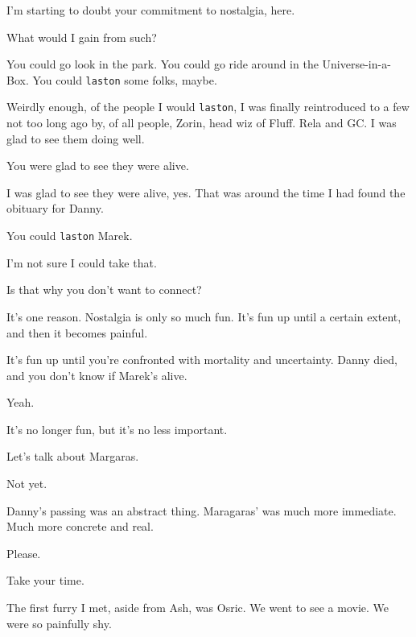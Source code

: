 \begin{paracol}{2}
\begin{leftcolumn}
\begin{ally}
I'm starting to doubt your commitment to nostalgia, here.
\end{ally}
What would I gain from such?

\begin{ally}
You could go look in the park. You could go ride around in the Universe-in-a-Box. You could \texttt{laston} some folks, maybe.
\end{ally}
Weirdly enough, of the people I would \texttt{laston}, I was finally reintroduced to a few not too long ago by, of all people, Zorin, head wiz of Fluff. Rela and GC. I was glad to see them doing well.

\begin{ally}
You were glad to see they were alive.
\end{ally}
I was glad to see they were alive, yes. That was around the time I had found the obituary for Danny.

\begin{ally}
You could \texttt{laston} Marek.
\end{ally}
I'm not sure I could take that.

\begin{ally}
Is that why you don't want to connect?
\end{ally}
It's one reason. Nostalgia is only so much fun. It's fun up until a certain extent, and then it becomes painful.

\begin{ally}
It's fun up until you're confronted with mortality and uncertainty. Danny died, and you don't know if Marek's alive.
\end{ally}
Yeah.

It's no longer fun, but it's no less important.

\begin{ally}
Let's talk about Margaras.
\end{ally}
Not yet.

\begin{ally}
Danny's passing was an abstract thing. Maragaras' was much more immediate. Much more concrete and real.
\end{ally}
Please.

\begin{ally}
Take your time.
\end{ally}
\newpage

\noindent The first furry I met, aside from Ash, was Osric. We went to see a movie. We were so painfully shy.


\end{leftcolumn}
\end{paracol}
